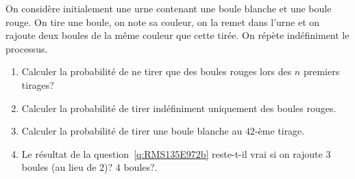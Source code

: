 \begin{enonce}
\begin{exercise}[ID={RMS135 E972},subtitle={Mines-Ponts PSI 2024},tags={oraux},difficulty={}]
On considère initialement une urne contenant une boule blanche et une boule rouge.
On tire une boule, on note sa couleur, on la remet dans l'urne et on rajoute deux boules de la même couleur que cette tirée.
On répète indéfiniment le processus.
\begin{enumerate}
  \item Calculer la probabilité de ne tirer que des boules rouges lors des $n$ premiers tirages?

  \item \label{q:RMS135E972b} Calculer la probabilité de tirer indéfiniment uniquement des boules rouges.

  \item Calculer la probabilité de tirer une boule blanche au $42$-ème tirage.

  \item Le résultat de la question~\ref{q:RMS135E972b} reste-t-il vrai si on rajoute $3$ boules (au lieu de $2$)? $4$ boules?.
\end{enumerate}
\end{exercise}
\begin{solution}
\end{solution}
\end{enonce}
